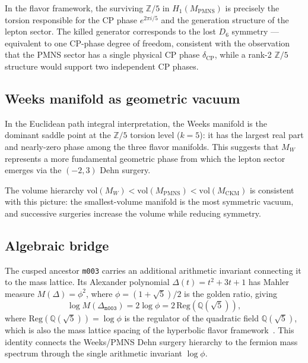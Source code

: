 \documentclass[12pt]{article}
\theoremstyle{definition}
\begin{document}
In the flavor framework, the surviving $\mathbb{Z}/5$ in
$H_1(M_\mathrm{PMNS})$ is precisely the torsion responsible for the
CP phase $e^{2\pi i/5}$ and the generation structure of the lepton
sector. The killed generator corresponds to the lost $D_6$
symmetry — equivalent to one CP-phase degree of freedom, consistent
with the observation that the PMNS sector has a single physical
CP phase $\delta_\mathrm{CP}$, while a rank-2 $\mathbb{Z}/5$
structure would support two independent CP phases.

\subsection{Weeks manifold as geometric vacuum}

In the Euclidean path integral interpretation, the Weeks manifold is
the dominant saddle point at the $\mathbb{Z}/5$ torsion level ($k=5$):
it has the largest real part and nearly-zero phase among the three
flavor manifolds. This suggests that $M_W$ represents a more
fundamental geometric phase from which the lepton sector emerges via
the $(-2,3)$ Dehn surgery.

The volume hierarchy $\mathrm{vol}(M_W) < \mathrm{vol}(M_\mathrm{PMNS})
< \mathrm{vol}(M_\mathrm{CKM})$ is consistent with this picture:
the smallest-volume manifold is the most symmetric vacuum, and
successive surgeries increase the volume while reducing symmetry.

\subsection{Algebraic bridge}

The cusped ancestor \texttt{m003} carries an additional arithmetic
invariant connecting it to the mass lattice. Its Alexander polynomial
$\Delta(t) = t^2 + 3t + 1$ has Mahler measure $M(\Delta) = \phi^2$,
where $\phi = (1+\sqrt{5})/2$ is the golden ratio, giving
\begin{equation}
  \log M(\Delta_{\texttt{m003}}) = 2\log\phi
  = 2\,\mathrm{Reg}(\mathbb{Q}(\sqrt{5})),
  \label{eq:mahler}
\end{equation}
where $\mathrm{Reg}(\mathbb{Q}(\sqrt{5})) = \log\phi$ is the regulator
of the quadratic field $\mathbb{Q}(\sqrt{5})$, which is also the
mass lattice spacing of the hyperbolic flavor
framework~\cite{Gentry:JKTR}. This identity connects the Weeks/PMNS
Dehn surgery hierarchy to the fermion mass spectrum through the single
arithmetic invariant $\log\phi$.
\end{document}
